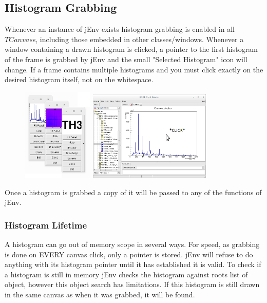 \documentclass[a4paper,10pt]{article}
\begin{document}
\subsection{Histogram Grabbing}
Whenever an instance of jEnv exists histogram grabbing is enabled in all $TCanvas$s, including those embedded in other classes/windows. Whenever a window containing a drawn histogram is clicked, a pointer to the first histogram of the frame is grabbed by jEnv and the small "Selected Histogram" icon will change. If a frame contains multiple histograms and you must click exactly on the desired histogram itself, not on the whitespace.

\begin{figure}[!h]
\centering
\includegraphics[width=0.3\textwidth]{jEnvB.png}
\includegraphics[width=0.52\textwidth]{jEnvD.png}     
\end{figure}

Once a histogram is grabbed a copy of it will be passed to any of the functions of jEnv.

\subsubsection{Histogram Lifetime}
A histogram can go out of memory scope in several ways. For speed, as grabbing is done on EVERY canvas click, only a pointer is stored. jEnv will refuse to do anything with its histogram pointer until it has established it is valid. To check if a histogram is still in memory jEnv checks the histogram against roots list of object, however this object search has limitations. If this histogram is still drawn in the same canvas as when it was grabbed, it will be found.
\end{document}
